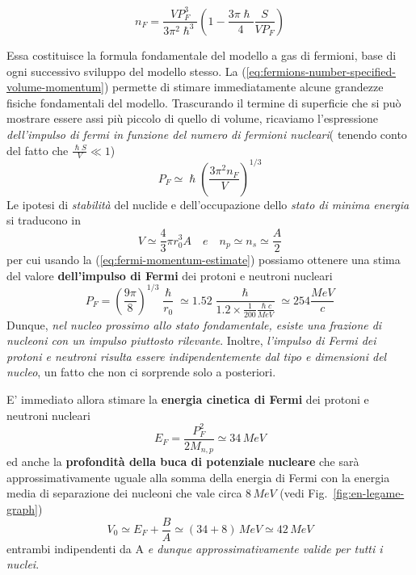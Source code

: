 \begin{equation}
	n_{F} = \frac{V P_{F}^{3}}{3 \pi^{2}\hslash^{3}} \left( 1 - \frac{3\pi \hslash}{4} \frac{S}{VP_{F}} \right)
	\label{eq:fermions-number-specified-volume-momentum}
\end{equation}

Essa costituisce la formula fondamentale del modello a gas di fermioni, base di ogni successivo sviluppo del modello stesso.
La (\ref{eq:fermions-number-specified-volume-momentum}) permette di stimare immediatamente alcune grandezze fisiche fondamentali del modello. Trascurando il termine di superficie che si può mostrare essere assi più piccolo di quello di volume, ricaviamo l’espressione \emph{dell’impulso di fermi in funzione del numero di fermioni nucleari}( tenendo conto del fatto che $\frac{\hslash S}{V} \ll 1$)
\begin{equation}
	P_{F} \simeq \hslash \left(\frac{3\pi^{2}n_{F}}{V} \right)^{1/3}
	\label{eq:fermi-momentum-estimate}
\end{equation}
Le ipotesi di \emph{stabilità} del nuclide e dell'occupazione dello \emph{stato di minima energia} si traducono in
\[
	V \simeq \frac{4}{3}\pi r_{0}^{3}A \quad e \quad n_{p}\simeq n_{s} \simeq \frac{A}{2}
\]
per cui usando la (\ref{eq:fermi-momentum-estimate}) possiamo ottenere una stima del valore \textbf{dell’impulso di Fermi} dei protoni e neutroni nucleari
\[
P_{F} = \left( \frac{9\pi}{8} \right)^{1/3} \frac{\hslash}{r_{0}} \simeq 1.52 \frac{\hslash}{1.2 \times \frac{1}{200}\frac{\hslash c}{MeV}} \simeq 254 \frac{MeV}{c}
\]
Dunque, \emph{nel nucleo prossimo allo stato fondamentale, esiste una frazione di nucleoni con un impulso piuttosto rilevante}. Inoltre, \emph{l’impulso di Fermi dei protoni e neutroni risulta essere indipendentemente dal tipo e dimensioni del nucleo}, un fatto che non ci sorprende solo a posteriori.
\bigskip

E’ immediato allora stimare la \textbf{energia cinetica di Fermi} dei protoni e neutroni nucleari
\begin{equation}
	E_{F} = \frac{P_{F}^{2}}{2M_{n,p}} \simeq 34 \, MeV
	\label{eq:fermi-kinetic-energy-estimate}
\end{equation}
ed anche la \textbf{profondità della buca di potenziale nucleare} che sarà approssimativamente uguale alla somma della energia di Fermi con la energia media di separazione dei nucleoni che vale circa $8 \, MeV$
(vedi Fig.~\ref{fig:en-legame-graph})
\begin{equation}
	V_{0} \simeq E_{F} + \frac{B}{A} \simeq (34 + 8)\, MeV \simeq 42 \, MeV
   \label{eq:potential-well-fermion-gas-estimate}
\end{equation}
entrambi indipendenti da A \emph{e dunque approssimativamente valide per tutti i nuclei}.

